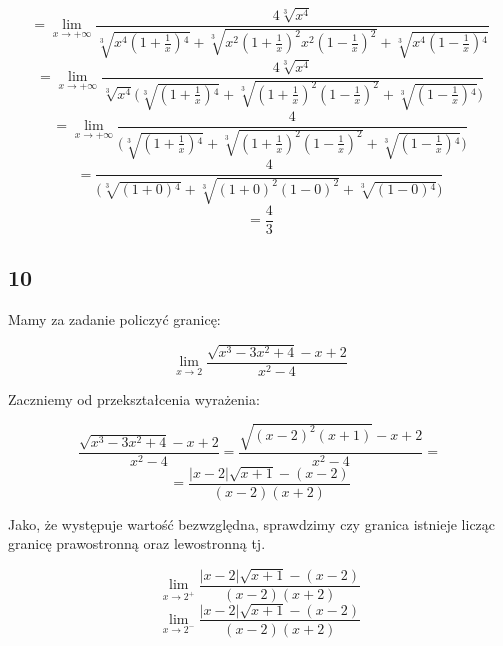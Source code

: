 \documentclass{article}
\begin{document}
\begin{equation*}
    = \lim_{x \to + \infty} \frac{4 \sqrt[3]{x^4}}{\sqrt[3]{x^{4} (1 + \frac{1}{x}){^4}} + \sqrt[3]{x^{2} (1 + \frac{1}{x})^{2} x^{2} (1 - \frac{1}{x})^{2}} +  \sqrt[3]{x^{4} (1 - \frac{1}{x}){^4}}}
\end{equation*}
\begin{equation*}
    = \lim_{x \to + \infty} \frac{4 \sqrt[3]{x^4}}{\sqrt[3]{x^{4}} \Bigg(\sqrt[3]{(1 + \frac{1}{x}){^4}} + \sqrt[3]{(1 + \frac{1}{x})^{2}(1 - \frac{1}{x})^{2}} +  \sqrt[3]{(1 - \frac{1}{x}){^4}}\Bigg)}
\end{equation*}
\begin{equation*}
    = \lim_{x \to + \infty} \frac{4}{\Bigg(\sqrt[3]{(1 + \frac{1}{x}){^4}} + \sqrt[3]{(1 + \frac{1}{x})^{2}(1 - \frac{1}{x})^{2}} +  \sqrt[3]{(1 - \frac{1}{x}){^4}}\Bigg)}
\end{equation*}
\begin{equation*}
    = \frac{4}{\Bigg(\sqrt[3]{(1 + 0){^4}} + \sqrt[3]{(1 + 0)^{2}(1 - 0)^{2}} +  \sqrt[3]{(1 - 0){^4}}\Bigg)}
\end{equation*}
\begin{equation*}
    = \frac{4}{3}
\end{equation*}

\subsection*{10}
Mamy za zadanie policzyć granicę:

\begin{equation*}
    \lim_{x \to 2} \frac{\sqrt{x^3 - 3x^2 +4} -x + 2}{x^2 - 4} 
\end{equation*}


Zaczniemy od przekształcenia wyrażenia:

\begin{equation*}
    \frac{\sqrt{x^3 - 3x^2 +4} -x + 2}{x^2 - 4} = \frac{\sqrt{(x - 2)^{2}(x+1)} -x + 2}{x^2 - 4} =
\end{equation*}
\begin{equation*}
    = \frac{|x-2|\sqrt{x+1} - (x - 2)}{(x -2)(x+2)}
\end{equation*}

Jako, że występuje wartość bezwzględna, sprawdzimy czy granica istnieje licząc granicę prawostronną oraz lewostronną tj.

\begin{equation*}
    \lim_{x \to 2^+} \frac{|x-2|\sqrt{x+1} - (x - 2)}{(x -2)(x+2)}
\end{equation*}
\begin{equation*}
    \lim_{x \to 2^-} \frac{|x-2|\sqrt{x+1} - (x - 2)}{(x -2)(x+2)}
\end{equation*}
\end{document}
